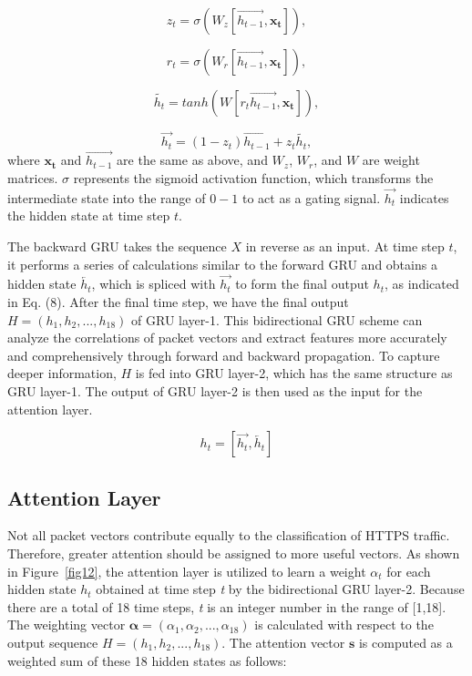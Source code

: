 \documentclass[preprint,12pt]{elsarticle}
\begin{document}
\begin{equation}
    z_t = \sigma(W_z[\overrightarrow{h_{t-1}},\mathbf{x_t}]),
\end{equation}

\begin{equation}
    r_t = \sigma(W_r[\overrightarrow{h_{t-1}},\mathbf{x_t}]),
\end{equation}


\begin{equation}
    \tilde{h_t} = tanh(W[r_t \overrightarrow{h_{t-1}},\mathbf{x_t}]),
\end{equation}

\begin{equation}
    \overrightarrow{h_t} = (1-z_t) \overrightarrow{h_{t-1}} + z_t \tilde{h_t},
\end{equation}
where $\mathbf{x_t}$ and $\overrightarrow{h_{t-1}}$ are the same as above, and $W_z$, $W_r$, and $W$ are weight matrices. $\sigma$ represents the sigmoid activation function, which transforms the intermediate state into the range of $0-1$ to act as a gating signal. $\overrightarrow{h_t}$ indicates the hidden state at time step $t$.


The backward GRU takes the sequence $X$ in reverse as an input. At time step $t$, it performs a series of calculations similar to the forward GRU and obtains a hidden state $\overleftarrow{h_t}$, which is spliced with $\overrightarrow{h_t}$ to form the final output $h_t$, as indicated in Eq. (8). After the final time step, we have the final output $H = (h_1, h_2,...,h_{18})$ of GRU layer-1. This bidirectional GRU scheme can analyze the correlations of packet vectors and extract features more accurately and comprehensively through forward and backward propagation. To capture deeper information, $H$ is fed into GRU layer-2, which has the same structure as GRU layer-1. The output of GRU layer-2 is then used as the input for the attention layer.


\begin{equation}
    h_t = [\overrightarrow{h_t},\overleftarrow{h_t}]
\end{equation}



\subsection{Attention Layer}
Not all packet vectors contribute equally to the classification of HTTPS traffic. Therefore, greater attention should be assigned to more useful vectors. As shown in Figure~\ref{fig12}, the attention layer is utilized to learn a weight $\alpha{_{t}}$ for each hidden state $h_t$ obtained at time step \textit{t} by the bidirectional GRU layer-2. Because there are a total of 18 time steps, \textit{t} is an integer number in the range of [1,18]. The weighting vector $\bm{\alpha} = (\alpha{_1},\alpha{_2},...,\alpha{_{18}})$ is calculated with respect to the output sequence $H = (h_1, h_2,...,h_{18})$. The attention vector $\textbf{s}$ is computed as a weighted sum of these 18 hidden states as follows:
\end{document}
